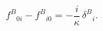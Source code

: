 \begin{equation}\label{33}
 f^{B}{}_{0i} -f^{B}{}_{i0} =-\frac{i}\kappa\, \delta^B{}_i.
\end{equation}

